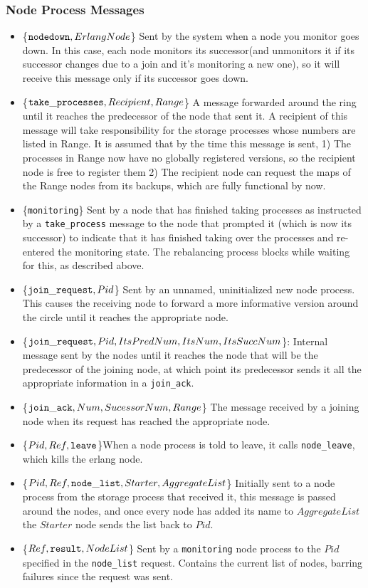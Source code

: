 \documentclass[a4paper]{article}
\begin{document}
\subsubsection{Node Process Messages}
\label{nodemsg}
\begin{itemize}
\item\{${\tt nodedown}, ErlangNode$\} Sent by the system when a node you monitor goes down. In this case, each node monitors its successor(and unmonitors it if its successor changes due to a join and it's monitoring a new one), so it will receive this message only if its successor goes down.
\item\{${\tt take\_processes}, Recipient, Range$\} A message forwarded around the ring until it reaches the predecessor of the node that sent it. A recipient of this message will take responsibility for the storage processes whose numbers are listed in Range. It is assumed that by the time this message is sent,
1) The processes in Range now have no globally registered versions, so the recipient node is free to register them
2) The recipient node can request the maps of the Range nodes from its backups, which are fully functional by now.
\item\{{\tt monitoring}\} Sent by a node that has finished taking processes as instructed by a {\tt take\_process} message to the node that prompted it (which is now its successor) to indicate that it has finished taking over the processes and re-entered the monitoring state. The rebalancing process blocks while waiting for this, as described above.
\item\{${\tt join\_request}, Pid$\} Sent by an unnamed, uninitialized new node process. This causes the receiving node to forward a more informative version around the circle until it reaches the appropriate node.
\item\{${\tt join\_request}, Pid, ItsPredNum, ItsNum, ItsSuccNum$\}: Internal message sent by the nodes until it reaches the node that will be the predecessor of the joining node, at which point its predecessor sends it all the appropriate information in a {\tt join\_ack}.
\item\{${\tt join\_ack}, Num, SucessorNum, Range$\} The message received by a joining node when its request has reached the appropriate node.
\item\{$Pid, Ref, {\tt leave}$\}When a node process is told to leave, it calls {\tt node\_leave}, which kills the erlang node.
\item\{$Pid, Ref, {\tt node\_list}, Starter, AggregateList$\} Initially sent to a node process from the storage process that received it, this message is passed around the nodes, and once every node has added its name to $AggregateList$ the $Starter$ node sends the list back to $Pid$.
\item\{$Ref, {\tt result}, NodeList$\} Sent by a {\tt monitoring} node process to the $Pid$ specified in the {\tt node\_list} request. Contains the current list of nodes, barring failures since the request was sent.
\end{itemize}
\end{document}
